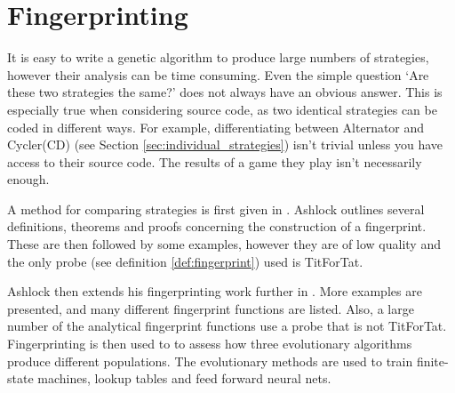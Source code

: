 \section{Fingerprinting}\label{sec:fingerprinting}
It is easy to write a genetic algorithm to produce large numbers of strategies, however their analysis can be time consuming.
Even the simple question `Are these two strategies the same?' does not always have an obvious answer.
This is especially true when considering source code, as two identical strategies can be coded in different ways.
For example, differentiating between Alternator and Cycler(CD) (see Section \ref{sec:individual_strategies}) isn't trivial unless you have access to their source code.
The results of a game they play isn't necessarily enough.

A method for comparing strategies is first given in \cite{Ashlock2004}.
Ashlock outlines several definitions, theorems and proofs concerning the construction of a fingerprint.
These are then followed by some examples, however they are of low quality and the only probe (see definition \ref{def:fingerprint}) used is TitForTat.

Ashlock then extends his fingerprinting work further in \cite{Ashlock2008}.
More examples are presented, and many different fingerprint functions are listed.
Also, a large number of the analytical fingerprint functions use a probe that is not TitForTat.
Fingerprinting is then used to to assess how three evolutionary algorithms produce different populations.
The evolutionary methods are used to train finite-state machines, lookup tables and feed forward neural nets.

